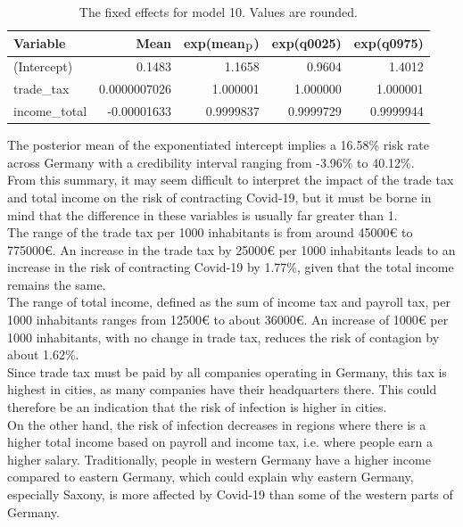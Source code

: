 \begin{table}[H] 
\caption{The fixed effects for model 10. Values are rounded. \label{fixedDemoGermany}}
\begin{tabular}{l r r r r}
\toprule
\textbf{Variable}	& \textbf{Mean}	& \textbf{exp(mean$_{\hbox{p}}$)} & \textbf{exp(q0025)} & \textbf{exp(q0975)} \\
\midrule
(Intercept) & 0.1483 & 1.1658 & 0.9604 & 1.4012\\
trade\_tax & 0.0000007026 & 1.000001  & 1.000000  & 1.000001 \\
income\_total & -0.00001633 & 0.9999837 & 0.9999729 & 0.9999944\\
\bottomrule
\end{tabular}
\end{table}
The posterior mean of the exponentiated intercept implies a 16.58\% risk rate across Germany with a credibility interval ranging from -3.96\% to 40.12\%.  \\
From this summary, it may seem difficult to interpret the impact of the trade tax and total income on the risk of contracting Covid-19, but it must be borne in mind that the difference in these variables is usually far greater than 1. \\
The range of the trade tax per 1000 inhabitants is from around 45000€ to 775000€. An increase in the trade tax by 25000€ per 1000 inhabitants leads to an increase in the risk of contracting Covid-19 by 1.77\%, given that the total income remains the same. \\
The range of total income, defined as the sum of income tax and payroll tax, per 1000 inhabitants ranges from 12500€ to about 36000€. An increase of 1000€ per 1000 inhabitants, with no change in trade tax, reduces the risk of contagion by about 1.62\%. \\
Since trade tax must be paid by all companies operating in Germany, this tax is highest in cities, as many companies have their headquarters there. This could therefore be an indication that the risk of infection is higher in cities. \\
On the other hand, the risk of infection decreases in regions where there is a higher total income based on payroll and income tax, i.e. where people earn a higher salary. Traditionally, people in western Germany have a higher income compared to eastern Germany, which could explain why eastern Germany, especially Saxony, is more affected by Covid-19 than some of the western parts of Germany.
